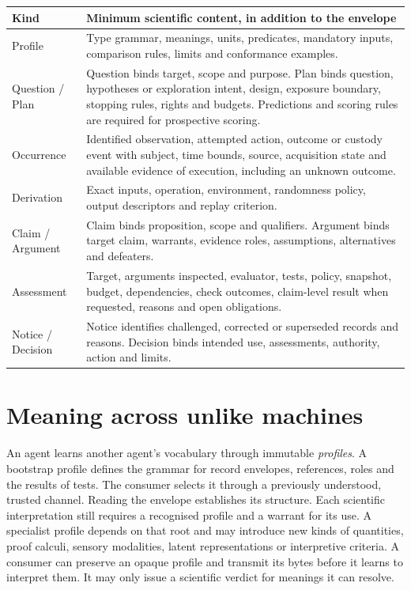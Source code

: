 \documentclass[11pt,a4paper]{article}
\newcommand{\partpage}[1]{\clearpage\section{#1}}
\begin{document}
\small
\begin{tabularx}{\linewidth}{@{}L{.19\linewidth}Y@{}}
\toprule
\textbf{Kind} & \textbf{Minimum scientific content, in addition to the envelope} \\ \midrule
Profile & Type grammar, meanings, units, predicates, mandatory inputs, comparison rules, limits and conformance examples. \\
Question / Plan & Question binds target, scope and purpose. Plan binds question, hypotheses or exploration intent, design, exposure boundary, stopping rules, rights and budgets. Predictions and scoring rules are required for prospective scoring. \\
Occurrence & Identified observation, attempted action, outcome or custody event with subject, time bounds, source, acquisition state and available evidence of execution, including an unknown outcome. \\
Derivation & Exact inputs, operation, environment, randomness policy, output descriptors and replay criterion. \\
Claim / Argument & Claim binds proposition, scope and qualifiers. Argument binds target claim, warrants, evidence roles, assumptions, alternatives and defeaters. \\
Assessment & Target, arguments inspected, evaluator, tests, policy, snapshot, budget, dependencies, check outcomes, claim-level result when requested, reasons and open obligations. \\
Notice / Decision & Notice identifies challenged, corrected or superseded records and reasons. Decision binds intended use, assessments, authority, action and limits. \\
\bottomrule
\end{tabularx}
\normalsize

\partpage{Meaning across unlike machines}\label{sec:meaning}
An agent learns another agent's vocabulary through immutable \emph{profiles}. A bootstrap profile defines the grammar for record envelopes, references, roles and the results of tests. The consumer selects it through a previously understood, trusted channel. Reading the envelope establishes its structure. Each scientific interpretation still requires a recognised profile and a warrant for its use. A specialist profile depends on that root and may introduce new kinds of quantities, proof calculi, sensory modalities, latent representations or interpretive criteria. A consumer can preserve an opaque profile and transmit its bytes before it learns to interpret them. It may only issue a scientific verdict for meanings it can resolve.
\end{document}
